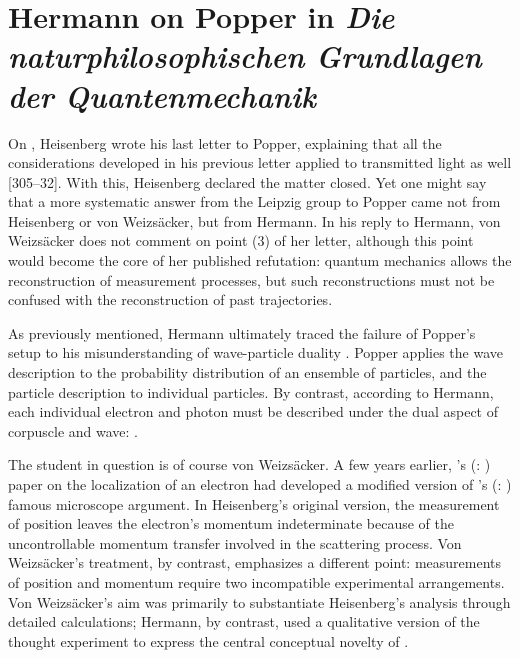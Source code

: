 \documentclass[pdflatex]{sn-jnl}
\renewcommand{\citets}[2][]{\citeauthor{#2}'s (\citeyear{#2}\if\relax\detokenize{#1}\relax\else: #1\fi)}
\newcommand{\TE}{thought experiment\xspace}
\newcommand{\vW}{von Weizsäcker\xspace}
\newcommand{\VW}{Von Weizsäcker\xspace}
\newcommand{\NGQ}[2]{\citep[#1/#2]{Hermann1935}}
\newcommand{\NGQd}[1]{\citep[#1]{Hermann1935}}
\begin{document}
\section{Hermann on Popper in \emph{Die naturphilosophischen Grundlagen der Quantenmechanik}}


On , Heisenberg wrote his last letter to Popper, explaining that all the considerations developed in his previous letter applied to transmitted light as well [305--32]. With this, Heisenberg declared the matter closed. Yet one might say that a more systematic  answer from the Leipzig group to Popper came not from Heisenberg or \vW, but from Hermann. In his reply to Hermann, \vW does not comment on point (3) of her letter, although this point would become the core of her published refutation: quantum mechanics allows the reconstruction of measurement processes, but such reconstructions must not be confused with the reconstruction of past trajectories.

As previously mentioned, Hermann ultimately traced the failure of Popper's setup to his misunderstanding of wave-particle duality \NGQd{\S2}. Popper applies the wave description to the probability distribution of an ensemble of particles, and the particle description to individual particles. By contrast, according to Hermann, each individual electron and photon must be described under the dual aspect of corpuscle and wave:  \NGQ{110--11}{257}.

The student in question is of course \vW. A few years earlier, \citets{Weizsacker1931} paper on the localization of an electron had developed a modified version of \citets{Heisenberg1927} famous microscope argument. In Heisenberg's original version, the measurement of position leaves the electron's momentum indeterminate because of the uncontrollable momentum transfer involved in the scattering process. \VW's treatment, by contrast, emphasizes a different point: measurements of position and momentum require two incompatible experimental arrangements. \VW's aim was primarily to substantiate Heisenberg's analysis through detailed calculations; Hermann, by contrast, used a qualitative version of the \TE to express the central conceptual novelty of \qm \citep{Filk2016}.
\end{document}

